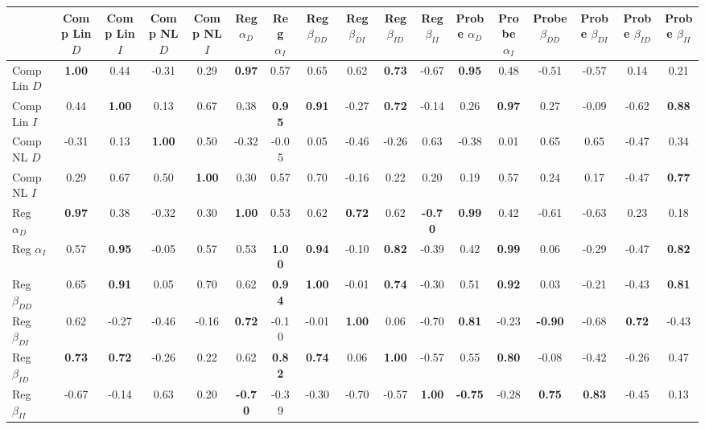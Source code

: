 \begin{table}[t]
\centering
\scriptsize
\begin{tabular}{lcccccccccccccccc}
\toprule
 & Comp Lin $D$ & Comp Lin $I$ & Comp NL $D$ & Comp NL $I$ & Reg $\alpha_{D}$ & Reg $\alpha_{I}$ & Reg $\beta_{DD}$ & Reg $\beta_{DI}$ & Reg $\beta_{ID}$ & Reg $\beta_{II}$ & Probe $\alpha_{D}$ & Probe $\alpha_{I}$ & Probe $\beta_{DD}$ & Probe $\beta_{DI}$ & Probe $\beta_{ID}$ & Probe $\beta_{II}$ \\
\midrule
Comp Lin $D$ & \textbf{1.00} & 0.44 & -0.31 & 0.29 & \textbf{0.97} & 0.57 & 0.65 & 0.62 & \textbf{0.73} & -0.67 & \textbf{0.95} & 0.48 & -0.51 & -0.57 & 0.14 & 0.21 \\
Comp Lin $I$ & 0.44 & \textbf{1.00} & 0.13 & 0.67 & 0.38 & \textbf{0.95} & \textbf{0.91} & -0.27 & \textbf{0.72} & -0.14 & 0.26 & \textbf{0.97} & 0.27 & -0.09 & -0.62 & \textbf{0.88} \\
Comp NL $D$ & -0.31 & 0.13 & \textbf{1.00} & 0.50 & -0.32 & -0.05 & 0.05 & -0.46 & -0.26 & 0.63 & -0.38 & 0.01 & 0.65 & 0.65 & -0.47 & 0.34 \\
Comp NL $I$ & 0.29 & 0.67 & 0.50 & \textbf{1.00} & 0.30 & 0.57 & 0.70 & -0.16 & 0.22 & 0.20 & 0.19 & 0.57 & 0.24 & 0.17 & -0.47 & \textbf{0.77} \\
Reg $\alpha_{D}$ & \textbf{0.97} & 0.38 & -0.32 & 0.30 & \textbf{1.00} & 0.53 & 0.62 & \textbf{0.72} & 0.62 & \textbf{-0.70} & \textbf{0.99} & 0.42 & -0.61 & -0.63 & 0.23 & 0.18 \\
Reg $\alpha_{I}$ & 0.57 & \textbf{0.95} & -0.05 & 0.57 & 0.53 & \textbf{1.00} & \textbf{0.94} & -0.10 & \textbf{0.82} & -0.39 & 0.42 & \textbf{0.99} & 0.06 & -0.29 & -0.47 & \textbf{0.82} \\
Reg $\beta_{DD}$ & 0.65 & \textbf{0.91} & 0.05 & 0.70 & 0.62 & \textbf{0.94} & \textbf{1.00} & -0.01 & \textbf{0.74} & -0.30 & 0.51 & \textbf{0.92} & 0.03 & -0.21 & -0.43 & \textbf{0.81} \\
Reg $\beta_{DI}$ & 0.62 & -0.27 & -0.46 & -0.16 & \textbf{0.72} & -0.10 & -0.01 & \textbf{1.00} & 0.06 & -0.70 & \textbf{0.81} & -0.23 & \textbf{-0.90} & -0.68 & \textbf{0.72} & -0.43 \\
Reg $\beta_{ID}$ & \textbf{0.73} & \textbf{0.72} & -0.26 & 0.22 & 0.62 & \textbf{0.82} & \textbf{0.74} & 0.06 & \textbf{1.00} & -0.57 & 0.55 & \textbf{0.80} & -0.08 & -0.42 & -0.26 & 0.47 \\
Reg $\beta_{II}$ & -0.67 & -0.14 & 0.63 & 0.20 & \textbf{-0.70} & -0.39 & -0.30 & -0.70 & -0.57 & \textbf{1.00} & \textbf{-0.75} & -0.28 & \textbf{0.75} & \textbf{0.83} & -0.45 & 0.13 \\

\end{tabular}
\end{table}
